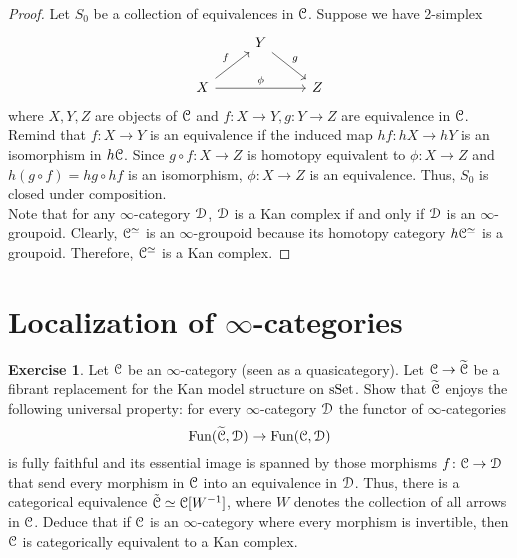 \documentclass[10pt,a4paper,reqno,oneside]{book} %
\theoremstyle{plain}
\theoremstyle{definition}
\newtheorem{exercise}[thm]{Exercise}
\theoremstyle{remark}
\numberwithin{equation}{section}
\begin{document}
\begin{proof}
    Let $S_0$ be a collection of equivalences in $\mathcal C$. Suppose we have 2-simplex
    \[ \begin{tikzcd}
	{} & Y \arrow{dr}{g} \\
	X \arrow{ur}{f} \arrow{rr}{\phi} & & Z
	\end{tikzcd} \]
	where $X,Y,Z$ are objects of $\mathcal C$ and $f:X \to Y, g:Y \to Z$ are equivalence in $\mathcal C$. Remind that $f:X \to Y$ is an equivalence if the induced map $hf:hX \to hY$ is an isomorphism in $h\mathcal C$. Since $g \circ f:X \to Z$ is homotopy equivalent to $\phi:X \to Z$ and $h(g\circ f)=hg\circ hf$ is an isomorphism, $\phi:X \to Z$ is an equivalence. Thus, $S_0$ is closed under composition.\\
	Note that for any $\infty$-category $\mathcal D$, $\mathcal D$ is a Kan complex if and only if $\mathcal D$ is an $\infty$-groupoid. 
	Clearly, $\mathcal C^{\simeq}$ is an $\infty$-groupoid because its homotopy category $h\mathcal C^{\simeq}$ is a groupoid. Therefore, $\mathcal C^{\simeq}$ is a Kan complex. 
    
\end{proof}

\section{Localization of $\infty$-categories}

\begin{exercise} \label{ex:eveloping_groupoid}
	Let $\mathcal C$ be an $\infty$-category (seen as a quasicategory).
	Let $\mathcal C \to \widetilde{\mathcal C}$ be a fibrant replacement for the Kan model structure on $\mathrm{sSet}$.
	Show that $\widetilde{\mathcal C}$ enjoys the following universal property: for every $\infty$-category $\mathcal D$ the functor of $\infty$-categories
	\[ \operatorname{Fun}(\widetilde{\mathcal C}, \mathcal D) \to \operatorname{Fun}(\mathcal C, \mathcal D) \]
	is fully faithful and its essential image is spanned by those morphisms $f \colon \mathcal C \to \mathcal D$ that send every morphism in $\mathcal C$ into an equivalence in $\mathcal D$.
	Thus, there is a categorical equivalence $\tilde{\mathcal C} \simeq \mathcal C[W^{-1}]$, where $W$ denotes the collection of all arrows in $\mathcal C$.
	Deduce that if $\mathcal C$ is an $\infty$-category where every morphism is invertible, then $\mathcal C$ is categorically equivalent to a Kan complex.
\end{exercise}
\end{document}
